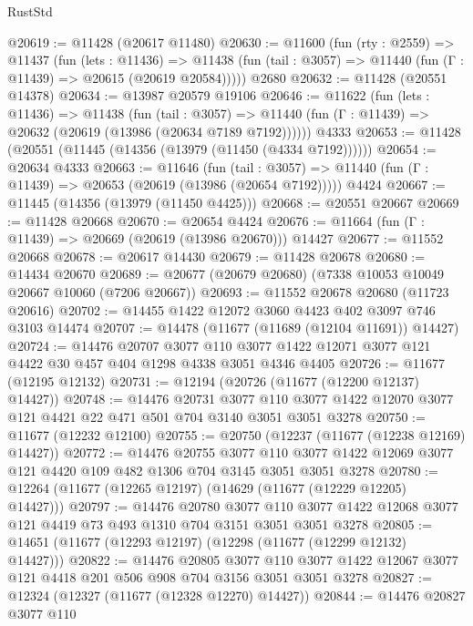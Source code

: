 \begin{lexlean}{RustStd}
\begin{coremodule}
@20619 := @11428 (@20617 @11480)
@20630 := @11600
    (fun (rty : @2559) =>
    @11437
      (fun (lets : @11436) =>
      @11438 (fun (tail : @3057) => @11440 (fun (Γ : @11439) => @20615 (@20619 @20584)))))
    @2680
@20632 := @11428 (@20551 @14378)
@20634 := @13987 @20579 @19106
@20646 := @11622
    (fun (lets : @11436) =>
    @11438
      (fun (tail : @3057) =>
      @11440 (fun (Γ : @11439) => @20632 (@20619 (@13986 (@20634 @7189 @7192))))))
    @4333
@20653 := @11428 (@20551 (@11445 (@14356 (@13979 (@11450 (@4334 @7192))))))
@20654 := @20634 @4333
@20663 := @11646
    (fun (tail : @3057) => @11440 (fun (Γ : @11439) => @20653 (@20619 (@13986 (@20654 @7192)))))
    @4424
@20667 := @11445 (@14356 (@13979 (@11450 @4425)))
@20668 := @20551 @20667
@20669 := @11428 @20668
@20670 := @20654 @4424
@20676 := @11664 (fun (Γ : @11439) => @20669 (@20619 (@13986 @20670))) @14427
@20677 := @11552 @20668
@20678 := @20617 @14430
@20679 := @11428 @20678
@20680 := @14434 @20670
@20689 := @20677 (@20679 @20680) (@7338 @10053 @10049 @20667 @10060 (@7206 @20667))
@20693 := @11552 @20678 @20680 (@11723 @20616)
@20702 := @14455 @1422 @12072 @3060 @4423 @402 @3097 @746 @3103 @14474
@20707 := @14478 (@11677 (@11689 (@12104 @11691)) @14427)
@20724 := @14476
    @20707
    @3077
    @110
    @3077
    @1422
    @12071
    @3077
    @121
    @4422
    @30
    @457
    @404
    @1298
    @4338
    @3051
    @4346
    @4405
@20726 := @11677 (@12195 @12132)
@20731 := @12194 (@20726 (@11677 (@12200 @12137) @14427))
@20748 := @14476
    @20731
    @3077
    @110
    @3077
    @1422
    @12070
    @3077
    @121
    @4421
    @22
    @471
    @501
    @704
    @3140
    @3051
    @3051
    @3278
@20750 := @11677 (@12232 @12100)
@20755 := @20750 (@12237 (@11677 (@12238 @12169) @14427))
@20772 := @14476
    @20755
    @3077
    @110
    @3077
    @1422
    @12069
    @3077
    @121
    @4420
    @109
    @482
    @1306
    @704
    @3145
    @3051
    @3051
    @3278
@20780 := @12264 (@11677 (@12265 @12197) (@14629 (@11677 (@12229 @12205) @14427)))
@20797 := @14476
    @20780
    @3077
    @110
    @3077
    @1422
    @12068
    @3077
    @121
    @4419
    @73
    @493
    @1310
    @704
    @3151
    @3051
    @3051
    @3278
@20805 := @14651 (@11677 (@12293 @12197) (@12298 (@11677 (@12299 @12132) @14427)))
@20822 := @14476
    @20805
    @3077
    @110
    @3077
    @1422
    @12067
    @3077
    @121
    @4418
    @201
    @506
    @908
    @704
    @3156
    @3051
    @3051
    @3278
@20827 := @12324 (@12327 (@11677 (@12328 @12270) @14427))
@20844 := @14476
    @20827
    @3077
    @110

\end{coremodule}
\end{lexlean}
